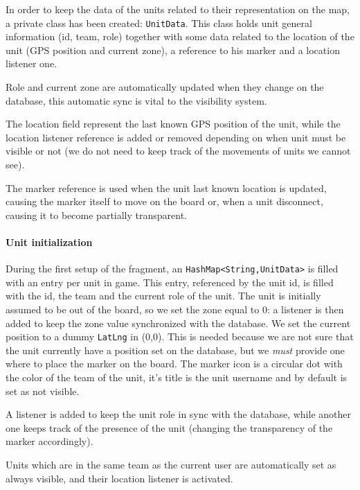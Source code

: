 				In order to keep the data of the units related to their representation on the map, a private class has been created: \lstinline|UnitData|.
				This class holds unit general information (id, team, role) together with some data related to the location of the unit (GPS position and current zone), a reference to his marker and a location listener one.
				
				Role and current zone are automatically updated when they change on the database, this automatic sync is vital to the visibility system.
				
				The location field represent the last known GPS position of the unit, while the location listener reference is added or removed depending on when unit must be visible or not (we do not need to keep track of the movements of units we cannot see).
				
				The marker reference is used when the unit last known location is updated, causing the marker itself to move on the board or, when a unit disconnect, causing it to become partially transparent.
			
				\paragraph{Unit initialization}
				
				During the first setup of the fragment, an \lstinline|HashMap<String,UnitData>| is filled with an entry per unit in game.
				This entry, referenced by the unit id, is filled with the id, the team and the current role of the unit.
				The unit is initially assumed to be out of the board, so we set the zone equal to 0: a listener is then added to keep the zone value synchronized with the database.
				We set the current position to a dummy \lstinline|LatLng| in (0,0). This is needed because we are not sure that the unit currently have a position set on the database, but we \emph{must} provide one where to place the marker on the board.
				The marker icon is a circular dot with the color of the team of the unit, it's title is the unit username and by default is set as not visible.
				
				A listener is added to keep the unit role in sync with the database, while another one keeps track of the presence of the unit (changing the transparency of the marker accordingly).
				
				Units which are in the same team as the current user are automatically set as always visible, and their location listener is activated.
				

